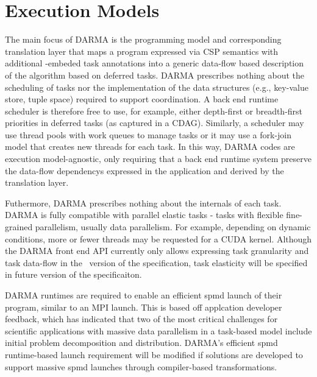 

\section{Execution Models}
\label{sec:exec_model}
The main focus of \gls{DARMA} is the \gls{programming model} and corresponding
\gls{translation layer} that maps a program expressed via \gls{CSP} semantics
with additional \CC{}-embeded task annotations into a generic data-flow based
description of the algorithm based on \gls{deferred tasks}.
\gls{DARMA} prescribes nothing about the scheduling of tasks nor the implementation 
of the data structures (e.g., \gls{key-value store}, \gls{tuple space}) required to support coordination.
A \gls{back end} \gls{runtime} scheduler is therefore free to use, for example,
either depth-first or breadth-first priorities in deferred tasks (as captured
in a \gls{CDAG}).
Similarly, a scheduler may use \gls{thread pools} with work queues to manage
tasks or it may use a \gls{fork-join} model that creates new threads for each task.
In this way, \gls{DARMA} codes are \gls{execution model}-agnostic, only
requiring that a \gls{back end} \gls{runtime system} preserve the
\glspl{data-flow dependency} expressed in the application and derived by the
\gls{translation layer}.

Futhermore, \gls{DARMA} prescribes nothing about the internals of each task.
\gls{DARMA} is fully compatible with parallel elastic tasks - tasks with
flexible fine-grained parallelism, usually \gls{data parallelism}.
For example, depending on dynamic conditions, more or fewer threads may be
requested for a \gls{CUDA} kernel.
Although the \gls{DARMA} \gls{front end} \gls{API} currently only allows
expressing task granularity and task data-flow in the \specVersion\ version of
the specification, task elasticity will be specified in future version of the
specificaiton.


\gls{DARMA} runtimes are required to enable an efficient
\gls{spmd} launch of their program, similar to an MPI launch.
This is based off applcation developer feedback, which has indicated that 
two of the most critical challenges for scientific applications with massive data parallelism in a task-based model
include initial problem decomposition and distribution.
\gls{DARMA}'s efficient \gls{spmd} runtime-based launch requirement 
will be modified if solutions are developed to support massive \gls{spmd} launches
through compiler-based transformations.

